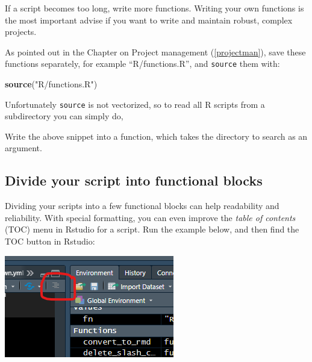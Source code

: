 \documentclass[]{book}
\newenvironment{Shaded}{\begin{snugshade}}{\end{snugshade}}
\newcommand{\ControlFlowTok}[1]{\textcolor[rgb]{0.13,0.29,0.53}{\textbf{#1}}}
\newcommand{\DataTypeTok}[1]{\textcolor[rgb]{0.13,0.29,0.53}{#1}}
\newcommand{\KeywordTok}[1]{\textcolor[rgb]{0.13,0.29,0.53}{\textbf{#1}}}
\newcommand{\NormalTok}[1]{#1}
\newcommand{\OtherTok}[1]{\textcolor[rgb]{0.56,0.35,0.01}{#1}}
\newcommand{\StringTok}[1]{\textcolor[rgb]{0.31,0.60,0.02}{#1}}
\let\BeginKnitrBlock\begin \let\EndKnitrBlock\end
\begin{document}
If a script becomes too long, write more functions. Writing your own functions is the most important advise if you want to write and maintain robust, complex projects.

As pointed out in the Chapter on Project management (\ref{projectman}), save these functions separately, for example ``R/functions.R'', and \texttt{source} them with:

\begin{Shaded}
\begin{Highlighting}[]
\KeywordTok{source}\NormalTok{(}\StringTok{"R/functions.R"}\NormalTok{)}
\end{Highlighting}
\end{Shaded}

Unfortunately \texttt{source} is not vectorized, so to read all R scripts from a subdirectory you can simply do,

\begin{Shaded}
\end{Shaded}

\BeginKnitrBlock{rmdtry}
Write the above snippet into a function, which takes the directory to search as an argument.
\EndKnitrBlock{rmdtry}

\hypertarget{divide-your-script-into-functional-blocks}{%
\subsection{Divide your script into functional blocks}\label{divide-your-script-into-functional-blocks}}

Dividing your scripts into a few functional blocks can help readability and reliability.
With special formatting, you can even improve the \emph{table of contents} (TOC) menu in Rstudio for a script. Run the example below, and then find the TOC button in Rstudio:

\includegraphics[width=0.3\linewidth]{screenshots/tablecontents_button}
\end{document}
